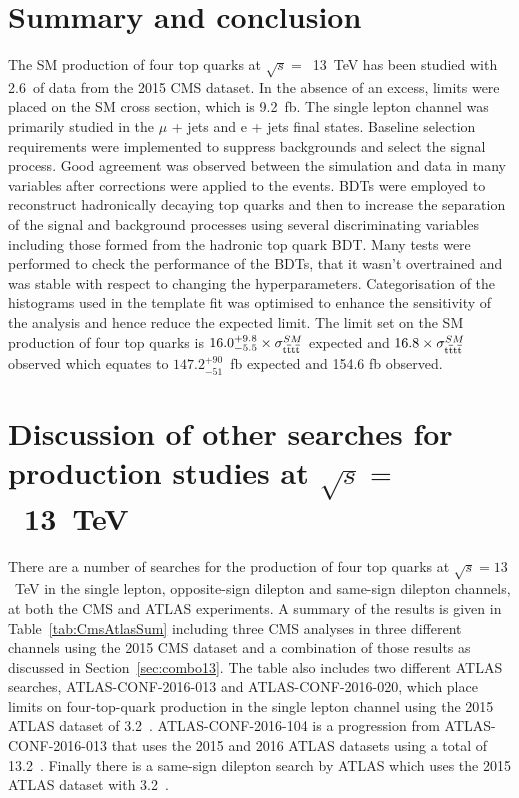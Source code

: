 \section{Summary and conclusion}
\label{sec:summary13}

The SM production of four top quarks at $\sqrt{s} =$~13~TeV has been studied with 2.6~\fbinv of data from the 2015 CMS dataset. In the absence of an excess, limits were placed on the SM cross section, which is 9.2~fb. The single lepton channel was primarily studied in the $\mu$ + jets and e + jets final states. Baseline selection requirements were implemented to suppress backgrounds and select the signal \tttt process. Good agreement was observed between the simulation and data in many variables after corrections were applied to the events. BDTs were employed to reconstruct hadronically decaying top quarks and then to increase the separation of the signal and background processes using several discriminating variables including those formed from the hadronic top quark BDT. Many tests were performed to check the performance of the BDTs, that it wasn't overtrained and was stable with respect to changing the hyperparameters. Categorisation of the histograms used in the template fit was optimised to enhance the sensitivity of the analysis and hence reduce the expected limit. The limit set on the SM production of four top quarks is $16.0^{+9.8}_{-5.5}\times \sigma_{{\mathrm{t}\overline{\mathrm{t}}\mathrm{t}\overline{\mathrm{t}}}}^{SM} $ expected and $16.8\times \sigma_{{\mathrm{t}\overline{\mathrm{t}}\mathrm{t}\overline{\mathrm{t}}}}^{SM} $ observed which equates to $147.2^{+90}_{-51}$~fb expected and 154.6 fb observed.

\section{Discussion of other searches for \tttt production studies at $\sqrt{s} =$~13~TeV}
\label{sec:ATLASresult13}

There are a number of searches for the production of four top quarks at $\sqrt{s}=13$~TeV in the single lepton, opposite-sign dilepton and same-sign dilepton channels, at both the CMS and ATLAS experiments. A summary of the results is given in Table~\ref{tab:CmsAtlasSum} including three CMS analyses in three different channels using the 2015 CMS dataset and a combination of those results as discussed in Section~\ref{sec:combo13}. The table also includes two different ATLAS searches, ATLAS-CONF-2016-013 and ATLAS-CONF-2016-020, which place limits on four-top-quark production in the single lepton channel using the 2015 ATLAS dataset of 3.2~\fbinv. ATLAS-CONF-2016-104 is a progression from ATLAS-CONF-2016-013 that uses the 2015 and 2016 ATLAS datasets using a total of 13.2~\fbinv. Finally there is a same-sign dilepton search by ATLAS which uses the 2015 ATLAS dataset with 3.2~\fbinv.

